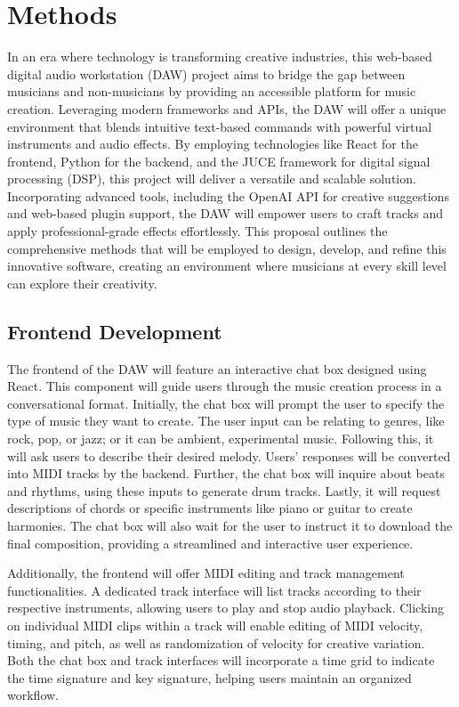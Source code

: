 \documentclass[10pt,twocolumn]{article}
\begin{document}
\section{Methods}
In an era where technology is transforming creative industries, this web-based digital audio workstation (DAW) project aims to bridge the gap between musicians and non-musicians by providing an accessible platform for music creation. Leveraging modern frameworks and APIs, the DAW will offer a unique environment that blends intuitive text-based commands with powerful virtual instruments and audio effects. By employing technologies like React for the frontend, Python for the backend, and the JUCE framework for digital signal processing (DSP), this project will deliver a versatile and scalable solution. Incorporating advanced tools, including the OpenAI API for creative suggestions and web-based plugin support, the DAW will empower users to craft tracks and apply professional-grade effects effortlessly. This proposal outlines the comprehensive methods that will be employed to design, develop, and refine this innovative software, creating an environment where musicians at every skill level can explore their creativity.
\subsection{Frontend Development}
The frontend of the DAW will feature an interactive chat box designed using React. This component will guide users through the music creation process in a conversational format. Initially, the chat box will prompt the user to specify the type of music they want to create. The user input can be relating to genres, like rock, pop, or jazz; or it can be ambient, experimental music. Following this, it will ask users to describe their desired melody. Users' responses will be converted into MIDI tracks by the backend. Further, the chat box will inquire about beats and rhythms, using these inputs to generate drum tracks. Lastly, it will request descriptions of chords or specific instruments like piano or guitar to create harmonies. The chat box will also wait for the user to instruct it to download the final composition, providing a streamlined and interactive user experience.

Additionally, the frontend will offer MIDI editing and track management functionalities. A dedicated track interface will list tracks according to their respective instruments, allowing users to play and stop audio playback. Clicking on individual MIDI clips within a track will enable editing of MIDI velocity, timing, and pitch, as well as randomization of velocity for creative variation. Both the chat box and track interfaces will incorporate a time grid to indicate the time signature and key signature, helping users maintain an organized workflow. 
\end{document}
